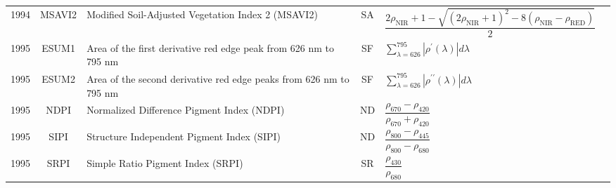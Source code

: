 \documentclass[10pt]{article}
\begin{document}
\begin{ThreePartTable}
\begin{longtable}{c c m{2.3in} c M{2.8in} M{1.5in}}
  1994 & MSAVI2  & Modified Soil-Adjusted Vegetation Index 2 (MSAVI2)                             & SA & $\dfrac{2\rho_\text{NIR}+1-\sqrt{(2\rho_\text{NIR}+1)^2-8(\rho_\text{NIR}-\rho_\text{RED})}}{2}$                                                                                                                                                                                        & \citet{Qi1994}                                      \\
  1995 & ESUM1   & Area of the first derivative red edge peak from 626 nm to 795 nm               & SF & $\sum\limits_{\lambda=626}^{795}|{\rho^\prime(\lambda)}|d\lambda$                                                                                                                                                                                                                       & \citet{Elvidge1995}                                 \\
  1995 & ESUM2   & Area of the second derivative red edge peaks from 626 nm to 795 nm             & SF & $\sum\limits_{\lambda=626}^{795}|{\rho^{\prime\prime}(\lambda)}|d\lambda$                                                                                                                                                                                                               & \citet{Elvidge1995}                                 \\
  1995 & NDPI    & Normalized Difference Pigment Index (NDPI)                                     & ND & $\dfrac{\rho_{670}-\rho_{420}}{\rho_{670}+\rho_{420}}$                                                                                                                                                                                                                                  & \citet{Penuelas1995a}                               \\
  1995 & SIPI    & Structure Independent Pigment Index (SIPI)                                     & ND & $\dfrac{\rho_{800}-\rho_{445}}{\rho_{800}-\rho_{680}}$                                                                                                                                                                                                                                  & \citet{Penuelas1995a}                               \\
  1995 & SRPI    & Simple Ratio Pigment Index (SRPI)                                              & SR & $\dfrac{\rho_{430}}{\rho_{680}}$                                                                                                                                                                                                                                                        & \citet{Penuelas1995b}                               \\

\end{longtable}
\end{ThreePartTable}
\end{document}
